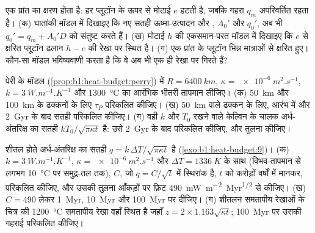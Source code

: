 \begin{exercise}[$\star\star\star$]\label{exo:b1:heat-budget:10}
एक प्रांत का क्षरण होता है: हर प्लूटॉन के ऊपर से मोटाई $e$ हटती है, जबकि गहरा  $q_m$ अपरिवर्तित रहता है। (क) घातांकी मॉडल में दिखाइए कि नए सतही ऊष्मा-उत्पादन और , $A_0'$ और $q_0'$, अब भी $q_0' = q_m + A_0'D$ को संतुष्ट करते हैं। (ख) मोटाई $h$ की एकसमान-परत मॉडल में दिखाइए कि $e$ से क्षरित प्लूटॉन ढलान $h - e$ की रेखा पर स्थित है। (ग) एक प्रांत के प्लूटॉन भिन्न मात्राओं से क्षरित हुए। कौन-सा मॉडल भविष्यवाणी करता है कि वे अब भी एक ही रेखा पर गिरते हैं?
\end{exercise}

\begin{exercise}[$\star\star\star$]\label{exo:b1:heat-budget:11}
पेरी के मॉडल (\cref{prop:b1:heat-budget:perry}) में $R = \qty{6400}{km}$, $\kappa = \qty{e-6}{m^2.s^{-1}}$, $k = \qty{3}{W.m^{-1}.K^{-1}}$ और \qty{1300}{\degreeCelsius} का आरंभिक भीतरी तापमान लीजिए। (क) \qty{50}{km} और \qty{100}{km} के ढक्कनों के लिए $\tau_P$ परिकलित कीजिए। (ख) \qty{50}{km} वाले ढक्कन के लिए, आरंभ में और \qty{2}{Gyr} के बाद सतही  परिकलित कीजिए। (ग) वही $k$ और $T_0$ रखने वाले केल्विन के चालक अर्ध-अंतरिक्ष का सतही  $kT_0/\sqrt{\pi\kappa t}$ है: उसे \qty{2}{Gyr} के बाद परिकलित कीजिए, और तुलना कीजिए।
\end{exercise}

\begin{exercise}[$\star\star\star$]\label{exo:b1:heat-budget:12}
शीतल होते अर्ध-अंतरिक्ष का सतही  $q = k\,\Delta T/\sqrt{\pi\kappa t}$ है (\cref{exo:b1:heat-budget:9})। (क) $k = \qty{3}{W.m^{-1}.K^{-1}}$, $\kappa =
\qty{e-6}{m^2.s^{-1}}$ और $\Delta T = \qty{1336}{K}$ के साथ (विभव-तापमान से लगभग \qty{10}{\degreeCelsius} पर समुद्र-तल तक), $C$, जो $q = C/\sqrt t$ में स्थिरांक है, $t$ को करोड़ों वर्षों में मानकर, परिकलित कीजिए, और उसकी तुलना आँकड़ों पर फ़िट \qty{490}{mW.m^{-2}.Myr^{1/2}} से कीजिए। (ख) $C = 490$ लेकर \qty{1}{Myr}, \qty{10}{Myr} और \qty{100}{Myr} पर  दीजिए। (ग) शीतलन समतापीय रेखाओं के चित्र की \qty{1200}{\degreeCelsius} समतापीय रेखा वहाँ स्थित है जहाँ $z = 2\times1.163\sqrt{\kappa t}$; \qty{100}{Myr} पर उसकी गहराई परिकलित कीजिए।
\end{exercise}

